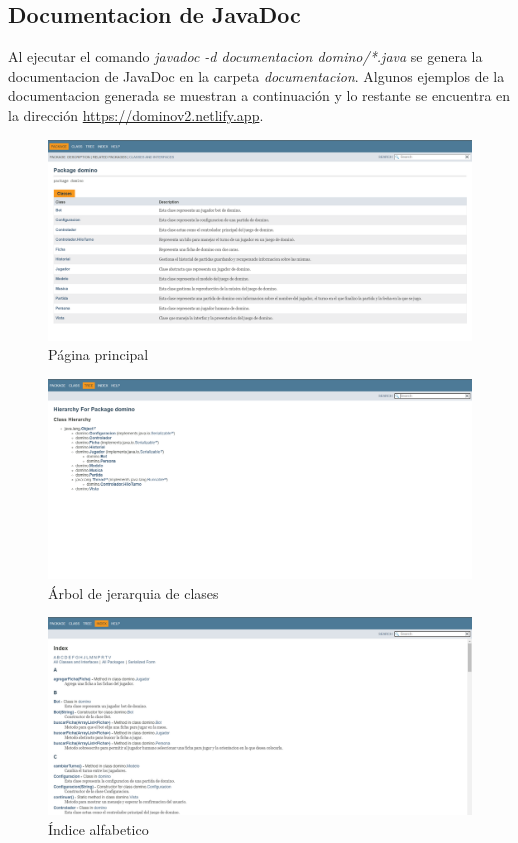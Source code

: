 \documentclass[12pt]{article}
\begin{document}
  \subsection{Documentacion de JavaDoc}
  Al ejecutar el comando \textit{javadoc -d documentacion domino/*.java} se genera la documentacion de JavaDoc en la carpeta \textit{documentacion}. Algunos ejemplos de la documentacion generada se muestran a continuación y lo restante se encuentra en la dirección \url{https://dominov2.netlify.app}.

  \begin{figure}[h!]
    \centering
    \includegraphics[width=\textwidth]{doc1.png}
    \caption{Página principal}
  \end{figure}

  \begin{figure}[h!]
    \centering
    \includegraphics[width=\textwidth]{doc2.png}
    \caption{Árbol de jerarquia de clases}
  \end{figure}

  \begin{figure}[h!]
    \centering
    \includegraphics[width=\textwidth]{doc3.png}
    \caption{Índice alfabetico}
  \end{figure}
\end{document}

